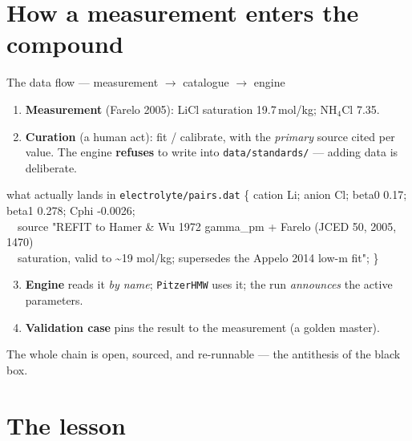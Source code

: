 \documentclass[aspectratio=169,11pt]{beamer}
\begin{document}
\section{How a measurement enters the compound}

\begin{frame}{The data flow --- measurement $\rightarrow$ catalogue $\rightarrow$ engine}
\small
\begin{enumerate}
  \item \textbf{Measurement} (Farelo 2005): LiCl saturation 19.7\,mol/kg; NH$_4$Cl 7.35.
  \item \textbf{Curation} (a human act): fit / calibrate, with the \emph{primary}
        source cited per value. The engine \textbf{refuses} to write into
        \texttt{data/standards/} --- adding data is deliberate.
\end{enumerate}
\begin{exampleblock}{\footnotesize what actually lands in \texttt{electrolyte/pairs.dat}}
\tiny\ttfamily
\{ cation Li; anion Cl; beta0 0.17; beta1 0.278; Cphi -0.0026; \\
\ \ source "REFIT to Hamer \& Wu 1972 gamma\_pm + Farelo (JCED 50, 2005, 1470) \\
\ \ saturation, valid to \textasciitilde19 mol/kg; supersedes the Appelo 2014 low-m fit"; \}
\end{exampleblock}
\begin{enumerate}\setcounter{enumi}{2}\small
  \item \textbf{Engine} reads it \emph{by name}; \texttt{PitzerHMW} uses it; the
        run \emph{announces} the active parameters.
  \item \textbf{Validation case} pins the result to the measurement (a golden master).
\end{enumerate}
\centerline{\footnotesize The whole chain is open, sourced, and re-runnable --- the antithesis of the black box.}
\end{frame}

\section{The lesson}
\end{document}
